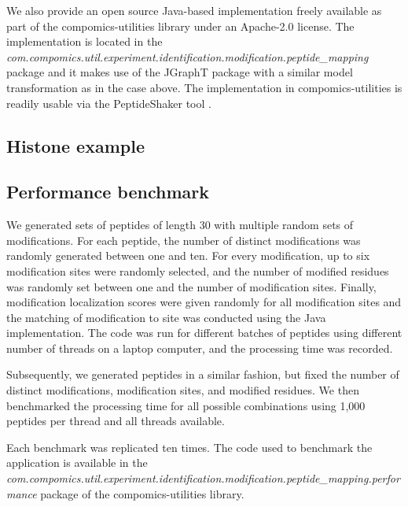 \documentclass[]{article}
\begin{document}
We also provide an open source Java-based implementation freely available as part of the compomics-utilities library \cite{compomics} under an Apache-2.0 license. The implementation is located in the \textit{com.compomics.util.experiment.identification.modification.peptide\_mapping} package and it makes use of the JGraphT package \cite{JGraphT} with a similar model transformation as in the case above. The implementation in compomics-utilities is readily usable via the PeptideShaker tool \cite{PeptideShaker}. 


\subsection{Histone example}


\subsection{Performance benchmark}

We generated sets of peptides of length 30 with multiple random sets of modifications. For each peptide, the number of distinct modifications was randomly generated between one and ten. For every modification, up to six modification sites were randomly selected, and the number of modified residues was randomly set between one and the number of modification sites. Finally, modification localization scores were given randomly for all modification sites and the matching of modification to site was conducted using the Java implementation. The code was run for different batches of peptides using different number of threads on a laptop computer, and the processing time was recorded. 

Subsequently, we generated peptides in a similar fashion, but fixed the number of distinct modifications, modification sites, and modified residues. We then benchmarked the processing time for all possible combinations using 1,000 peptides per thread and all threads available.

Each benchmark was replicated ten times. The code used to benchmark the application is available in the \textit{com.compomics.util.experiment.identification.modification.peptide\_mapping.performance} package of the compomics-utilities library.
\end{document}
